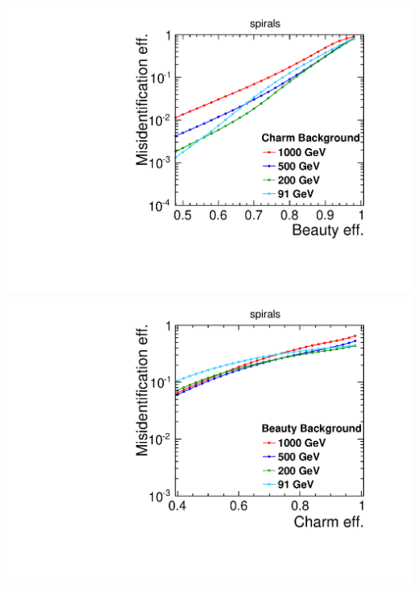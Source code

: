 \begin{frame}
  \begin{columns}
    \centering
    \includegraphics[width=\textwidth]{figures/Global_energies_CLIC_SiD_spirals_Beauty_Charm_.pdf}
    \centering
    \includegraphics[width=\textwidth]{figures/Global_energies_CLIC_SiD_spirals_Charm_Beauty_.pdf}
  \end{columns}

\end{frame}

